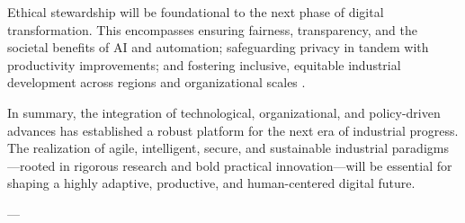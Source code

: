 \documentclass[11pt]{article}
\begin{document}
Ethical stewardship will be foundational to the next phase of digital transformation. This encompasses ensuring fairness, transparency, and the societal benefits of AI and automation; safeguarding privacy in tandem with productivity improvements; and fostering inclusive, equitable industrial development across regions and organizational scales \cite{ref35}\cite{ref41}\cite{ref90}.

In summary, the integration of technological, organizational, and policy-driven advances has established a robust platform for the next era of industrial progress. The realization of agile, intelligent, secure, and sustainable industrial paradigms—rooted in rigorous research and bold practical innovation—will be essential for shaping a highly adaptive, productive, and human-centered digital future.

---



\end{document}
